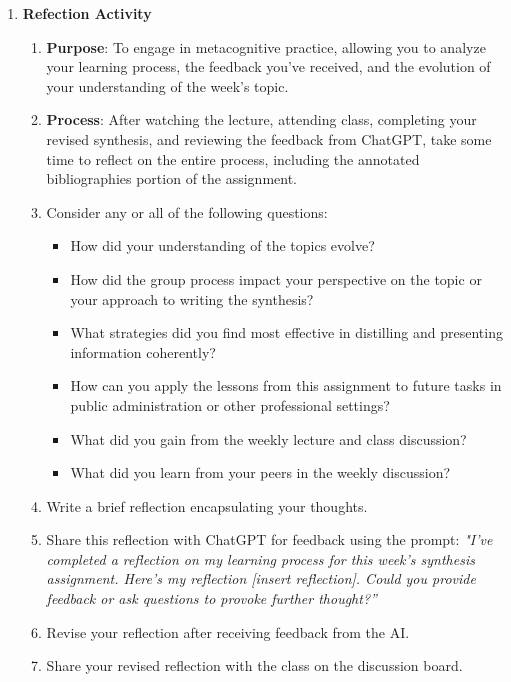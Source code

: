 \documentclass[12pt, letterpaper]{article}
\begin{document}
\begin{enumerate}
\item \textbf{Refection Activity}
    \begin{enumerate}
        \item \textbf{Purpose}: To engage in metacognitive practice, allowing you to analyze your learning process, the feedback you've received, and the evolution of your understanding of the week's topic. 
        \item \textbf{Process}: After watching the lecture, attending class, completing your revised synthesis, and reviewing the feedback from ChatGPT, take some time to reflect on the entire process, including the annotated bibliographies portion of the assignment. 
        \item Consider any or all of the following questions:
        \begin{itemize}
            \item How did your understanding of the topics evolve?
            \item How did the group process impact your perspective on the topic or your approach to writing the synthesis?
            \item What strategies did you find most effective in distilling and presenting information coherently?
            \item How can you apply the lessons from this assignment to future tasks in public administration or other professional settings?
            \item What did you gain from the weekly lecture and class discussion?
            \item What did you learn from your peers in the weekly discussion?
        \end{itemize}
        \item Write a brief reflection encapsulating your thoughts.
        \item Share this reflection with ChatGPT for feedback using the prompt: \textit{"I've completed a reflection on my learning process for this week's synthesis assignment. Here's my reflection [insert reflection]. Could you provide feedback or ask questions to provoke further thought?”}
        \item Revise your reflection after receiving feedback from the AI.
        \item Share your revised reflection with the class on the discussion board.
    \end{enumerate}
\end{enumerate}
\end{document}

